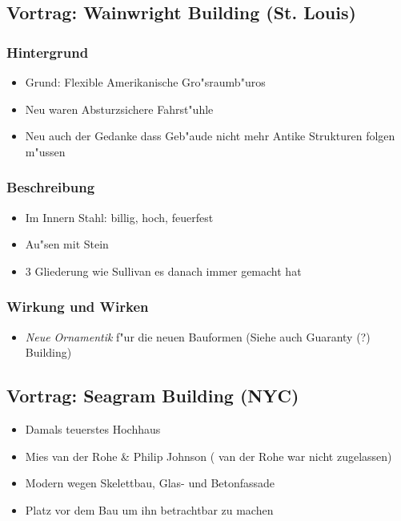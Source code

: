 \documentclass[emulatestandardclasses]{scrartcl}
\begin{document}
\subsection{Vortrag: Wainwright Building (St. Louis)}

\subsubsection{Hintergrund}

\begin{itemize}
  \item Grund: Flexible Amerikanische Gro"sraumb"uros
  \item Neu waren Absturzsichere Fahrst"uhle
  \item Neu auch der Gedanke dass Geb"aude nicht mehr Antike Strukturen folgen m"ussen
\end{itemize}


\subsubsection{Beschreibung}

\begin{itemize}
  \item Im Innern Stahl: billig, hoch, feuerfest
  \item Au"sen mit Stein 
  \item 3 Gliederung wie Sullivan es danach immer gemacht hat
\end{itemize}


\subsubsection{Wirkung und Wirken}

\begin{itemize}
  \item \emph{Neue Ornamentik} f"ur die neuen Bauformen (Siehe auch Guaranty (?) Building)
\end{itemize}

\subsection{Vortrag: Seagram Building (NYC)}


\begin{itemize}
  \item Damals teuerstes Hochhaus
  \item Mies van der Rohe \& Philip Johnson ( van der Rohe war nicht zugelassen)
  \item Modern wegen Skelettbau, Glas- und Betonfassade
  \item Platz vor dem Bau um ihn betrachtbar zu machen
\end{itemize}
\end{document}
